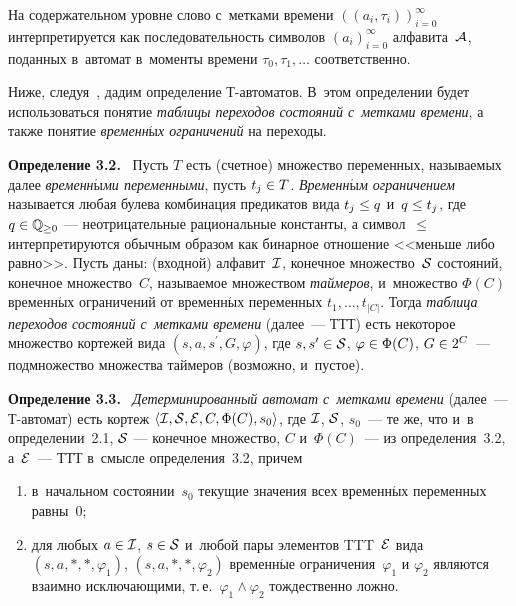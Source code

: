 \begin{multicols}{2}
На содержательном уровне слово с~метками времени $((a_i,\tau_i))_{i=0}^\infty$
интерпретируется как последовательность символов $(a_i)_{i=0}^\infty$ алфавита~$\mathcal A$, 
поданных в~автомат в~моменты времени $\tau_0, \tau_1, \ldots$
соответственно.

Ниже, следуя~\cite{timed-auto}, дадим определение Т-ав\-то\-ма\-тов.
В~этом определении будет использоваться понятие \textit{таблицы переходов состояний
с~метками
времени}, а также  понятие \textit{временн$\acute{\mbox{ы}}$х ограничений} на переходы.

\smallskip

\noindent
\textbf{Определение 3.2.}\
Пусть $T$ есть (счетное) множество переменных, называемых далее 
\textit{временн$\acute{\mbox{ы}}$ми переменными}, пусть $t_j\hm\in T$. 
\textit{Временн$\acute{\mbox{ы}}$м ограничением} называется
любая булева комбинация предикатов вида $t_j\hm\le q$ и~$q\hm\le t_j$, где
$q\in \mathbb{Q}_{\ge 0}$ --- неотрицательные рациональные константы, а символ~$\le$
интерпретируются обычным образом как бинарное отношение <<меньше  либо
равно>>. Пусть даны: (входной) алфавит~$\mathcal I$, конечное множество~$\mathcal S$ состояний,
конечное множество~$C$, называемое множеством \textit{таймеров}, и~множество
$\Phi(C)$  временн$\acute{\mbox{ы}}$х ограничений от временн$\acute{\mbox{ы}}$х переменных $t_1,\ldots,t_{|C|}$.
Тогда \textit{таблица переходов состояний
с~метками
времени} (далее~--- ТТТ) есть некоторое множество кортежей вида 
$(s,a,s^\prime, G,\varphi)$, где $s,s^\prime\hm\in \Cal S$, $\varphi\hm\in\Phi(C)$, 
$G\hm\in 2^C$~--- подмножество множества таймеров (возможно, и~пустое).

\smallskip

\noindent
\textbf{Определение 3.3.}\
\textit{Детерминированный автомат с~метками времени} (далее~--- Т-ав\-то\-мат) 
есть кортеж $\langle\mathcal I,\mathcal S,\mathcal E,C,
\Phi(C),s_0\rangle$,
где $\mathcal I$, $\mathcal S$, $s_0$~--- те же, что и~в  определении~2.1,
$\mathcal S$ --- конечное множество,  $C$ и~$\Phi(C)$~--- из определения~3.2, 
а~$\mathcal E$~--- ТТТ в~смысле определения~3.2, причем
\begin{enumerate}[(1)]
\item  в~начальном состоянии~$s_0$ текущие значения всех временн$\acute{\mbox{ы}}$х 
переменных равны~0;
\item для любых $a\hm\in\Cal I$, $s\hm\in\Cal S$ и~любой пары элементов TTT~$\mathcal E$
вида $(s,a,*,*,\varphi_1)$, $(s,a,*,*,\varphi_2)$ временн$\acute{\mbox{ы}}$е ограничения~$\varphi_1$
и $\varphi_2$ являются взаимно исключающими,  т.\,е.\  $\varphi_1\wedge\varphi_2$
тождественно ложно.
\end{enumerate}



\end{multicols}
